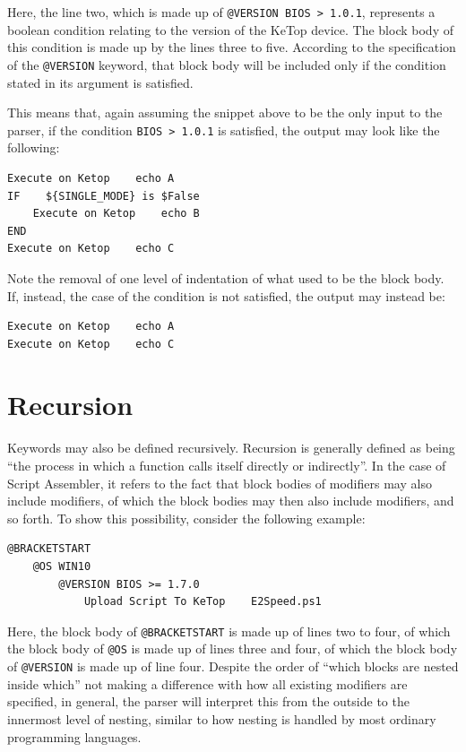 Here, the line two, which is made up of \verb|@VERSION BIOS > 1.0.1|, represents a boolean condition relating to the version of the KeTop device. The block body of this condition is made up by the lines three to five. According to the specification of the \verb|@VERSION| keyword, that block body will be included only if the condition stated in its argument is satisfied. 

This means that, again assuming the snippet above to be the only input to the parser, if the condition \verb|BIOS > 1.0.1| is satisfied, the output may look like the following:

\begin{lstlisting}
Execute on Ketop    echo A
IF    ${SINGLE_MODE} is $False
    Execute on Ketop    echo B
END
Execute on Ketop    echo C
\end{lstlisting}

Note the removal of one level of indentation of what used to be the block body. If, instead, the case of the condition is not satisfied, the output may instead be:

\begin{lstlisting}
Execute on Ketop    echo A
Execute on Ketop    echo C
\end{lstlisting}

\section{Recursion}

Keywords may also be defined recursively. Recursion is generally defined as being ``the process in which a function calls itself directly or indirectly''\cite{recursion}. In the case of Script Assembler, it refers to the fact that block bodies of modifiers may also include modifiers, of which the block bodies may then also include modifiers, and so forth. To show this possibility, consider the following example:

\begin{lstlisting}
@BRACKETSTART
    @OS WIN10
        @VERSION BIOS >= 1.7.0
            Upload Script To KeTop    E2Speed.ps1
\end{lstlisting}

Here, the block body of \verb|@BRACKETSTART| is made up of lines two to four, of which the block body of \verb|@OS| is made up of lines three and four, of which the block body of \verb|@VERSION| is made up of line four. Despite the order of ``which blocks are nested inside which'' not making a difference with how all existing modifiers are specified, in general, the parser will interpret this from the outside to the innermost level of nesting, similar to how nesting is handled by most ordinary programming languages. 

